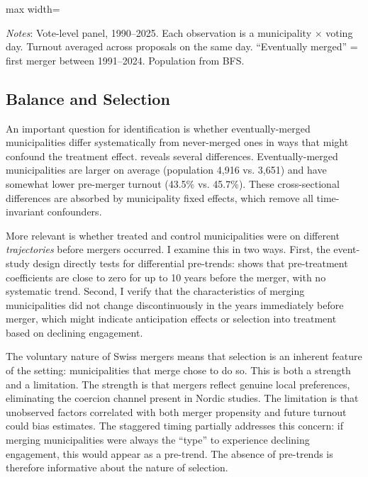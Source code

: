 \documentclass[12pt]{article}
\begin{document}
\begin{table}[H]
\centering
\caption{Summary Statistics}
\label{tab:summary}
\begin{adjustbox}{max width=\textwidth}

\end{adjustbox}
\vspace{0.3em}
\parbox{\textwidth}{\footnotesize \textit{Notes}: Vote-level panel, 1990--2025. Each observation is a municipality $\times$ voting day. Turnout averaged across proposals on the same day. ``Eventually merged'' = first merger between 1991--2024. Population from BFS.}
\end{table}


\subsection{Balance and Selection}

An important question for identification is whether eventually-merged municipalities differ systematically from never-merged ones in ways that might confound the treatment effect.  reveals several differences. Eventually-merged municipalities are larger on average (population 4,916 vs. 3,651) and have somewhat lower pre-merger turnout (43.5\% vs. 45.7\%). These cross-sectional differences are absorbed by municipality fixed effects, which remove all time-invariant confounders.

More relevant is whether treated and control municipalities were on different \textit{trajectories} before mergers occurred. I examine this in two ways. First, the event-study design directly tests for differential pre-trends:  shows that pre-treatment coefficients are close to zero for up to 10 years before the merger, with no systematic trend. Second, I verify that the characteristics of merging municipalities did not change discontinuously in the years immediately before merger, which might indicate anticipation effects or selection into treatment based on declining engagement.

The voluntary nature of Swiss mergers means that selection is an inherent feature of the setting: municipalities that merge chose to do so. This is both a strength and a limitation. The strength is that mergers reflect genuine local preferences, eliminating the coercion channel present in Nordic studies. The limitation is that unobserved factors correlated with both merger propensity and future turnout could bias estimates. The staggered timing partially addresses this concern: if merging municipalities were always the ``type'' to experience declining engagement, this would appear as a pre-trend. The absence of pre-trends is therefore informative about the nature of selection.
\end{document}
